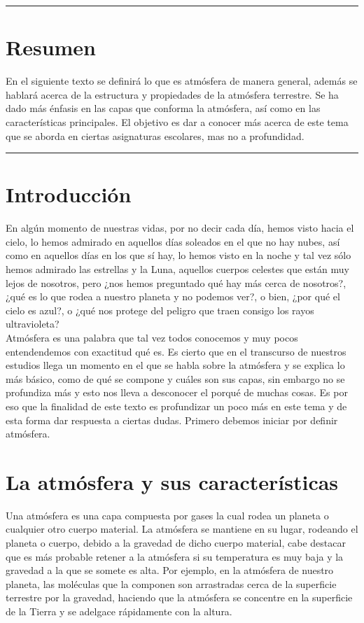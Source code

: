 \documentclass{article}
\begin{document}
\pagebreak
\begin{doublespace}

\hrule
\section*{Resumen}
En el siguiente texto se definirá lo que es atmósfera de manera general, además se hablará acerca de la estructura y propiedades de la atmósfera terrestre. Se ha dado más énfasis en las capas que conforma la atmósfera, así como en las características principales. El objetivo es dar a conocer más acerca de este tema que se aborda en ciertas asignaturas escolares, mas no a profundidad.
\vspace{0.5 cm}
\hrule

\vspace{0.6 cm}
\section{Introducción}
En algún momento de nuestras vidas, por no decir cada día, hemos visto hacia el cielo, lo hemos admirado en aquellos días soleados en el que no hay nubes, así como en aquellos días en los que sí hay, lo hemos visto en la noche y tal vez sólo hemos admirado las estrellas y la Luna, aquellos cuerpos celestes que están muy lejos de nosotros, pero ¿nos hemos preguntado qué hay más cerca de nosotros?, ¿qué es lo que rodea a nuestro planeta y no podemos ver?, o bien, ¿por qué el cielo es azul?, o ¿qué nos protege del peligro que traen consigo los rayos ultravioleta? 
\\

Atmósfera es una palabra que tal vez todos conocemos y muy pocos entendendemos con exactitud qué es. Es cierto que en el transcurso de nuestros estudios llega un momento en el que se habla sobre la atmósfera y se explica lo más básico, como de qué se compone y cuáles son sus capas, sin embargo no se profundiza más y esto nos lleva a desconocer el porqué de muchas cosas. Es por eso que la finalidad de este texto es profundizar un poco más en este tema y de esta forma dar respuesta a ciertas dudas. Primero debemos iniciar por definir atmósfera.

\section{La atmósfera y sus características}
Una atmósfera es una capa compuesta por gases la cual rodea un planeta o cualquier otro cuerpo material. La atmósfera se mantiene en su lugar, rodeando el planeta o cuerpo, debido a la gravedad de dicho cuerpo material, cabe destacar que es más probable retener a la atmósfera si su temperatura es muy baja y la gravedad a la que se somete es alta. Por ejemplo, en la atmósfera de nuestro planeta, las moléculas que la componen son arrastradas cerca de la superficie terrestre por la gravedad, haciendo que la atmósfera se concentre en la superficie de la Tierra y se adelgace rápidamente con la altura.
\\


\end{doublespace}
\end{document}
